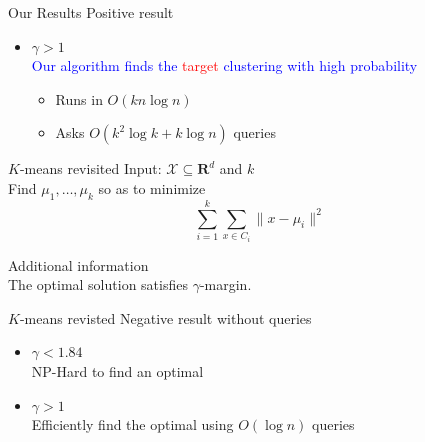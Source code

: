 \documentclass{beamer}
\newcommand{\mc}{\mathcal}
\newcommand{\mb}{\mathbf}
\begin{document}
\begin{frame}{Our Results}
  \alert{Positive result}
  \vspace{0.5cm}
  \begin{itemize}
    
    \item $\gamma > 1$ \\
    \vspace{0.3cm} \textcolor{blue}{Our algorithm finds the} \textcolor{red}{target} \textcolor{blue}{clustering with high probability}
    
    \begin{itemize}
    	\vspace{0.3cm}
        \item Runs in $O(kn\log n)$
        \vspace{0.3cm}
        \item Asks $O(k^2\log k + k\log n)$ queries
    \end{itemize}
   \end{itemize}
\end{frame}

\begin{frame}{$K$-means revisited}
	Input: $\mc X \subseteq \mb R^d$ and $k$\\
	\vspace{0.5cm}Find $\mu_1, \ldots, \mu_k$ so as to minimize
	$$\sum_{i=1}^k \sum_{x \in C_i} \|x - \mu_i\|^2$$
	
	\vspace{1cm}\alert{Additional information}\\
	\vspace{0.5cm} The optimal solution satisfies $\gamma$-margin.
\end{frame}

\begin{frame}{$K$-means revisted}
	\alert{Negative result without queries} 
	\vspace{0.5cm}
    \begin{itemize}
	    \item $\gamma < 1.84$ \\
	    \vspace{0.3cm} {NP-Hard to find an optimal}
	\end{itemize}

	\vspace{1cm}\color{blue}{Positive result with queries} 
	\vspace{0.5cm}
    \begin{itemize}
	    \item $\gamma > 1$ \\
	    \vspace{0.3cm} {Efficiently find the optimal using $O(\log n)$ queries}
	\end{itemize}
\end{frame}
\end{document}
